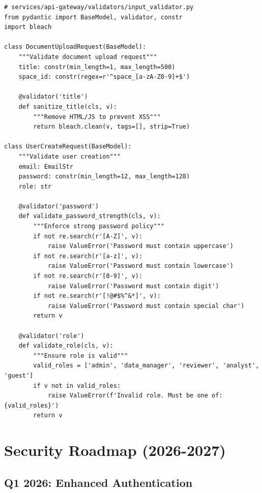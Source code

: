 \begin{lstlisting}[style=pythonstyle]
# services/api-gateway/validators/input_validator.py
from pydantic import BaseModel, validator, constr
import bleach

class DocumentUploadRequest(BaseModel):
    """Validate document upload request"""
    title: constr(min_length=1, max_length=500)
    space_id: constr(regex=r'^space_[a-zA-Z0-9]+$')
    
    @validator('title')
    def sanitize_title(cls, v):
        """Remove HTML/JS to prevent XSS"""
        return bleach.clean(v, tags=[], strip=True)

class UserCreateRequest(BaseModel):
    """Validate user creation"""
    email: EmailStr
    password: constr(min_length=12, max_length=128)
    role: str
    
    @validator('password')
    def validate_password_strength(cls, v):
        """Enforce strong password policy"""
        if not re.search(r'[A-Z]', v):
            raise ValueError('Password must contain uppercase')
        if not re.search(r'[a-z]', v):
            raise ValueError('Password must contain lowercase')
        if not re.search(r'[0-9]', v):
            raise ValueError('Password must contain digit')
        if not re.search(r'[!@#$%^&*]', v):
            raise ValueError('Password must contain special char')
        return v
    
    @validator('role')
    def validate_role(cls, v):
        """Ensure role is valid"""
        valid_roles = ['admin', 'data_manager', 'reviewer', 'analyst', 'guest']
        if v not in valid_roles:
            raise ValueError(f'Invalid role. Must be one of: {valid_roles}')
        return v
\end{lstlisting}

\section{Security Roadmap (2026-2027)}

\subsection{Q1 2026: Enhanced Authentication}

